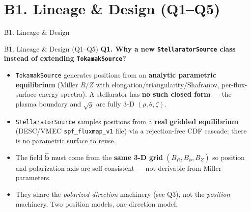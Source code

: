 \documentclass[11pt,aspectratio=169]{beamer}
\newcommand{\bhat}{\hat{\mathbf{b}}}
\newcommand{\qitem}[1]{\medskip\textbf{#1}\par}
\begin{document}
\section{B1. Lineage \& Design (Q1--Q5)}
\begin{frame}
\centering\vfill
{\Large\color{key} B1. Lineage \& Design}\par
{}
\vfill
\end{frame}

\begin{frame}[allowframebreaks]{B1. Lineage \& Design (Q1--Q5)}
\small
\qitem{Q1. Why a new \texttt{StellaratorSource} class instead of extending \texttt{TokamakSource}?}
\begin{itemize}
\item \texttt{TokamakSource} generates positions from an \textbf{analytic parametric
      equilibrium} (Miller $R/Z$ with elongation/triangularity/Shafranov, per-flux-surface
      energy spectra). A stellarator has \textbf{no such closed form} --- the plasma boundary
      and $\sqrt{g}$ are fully 3-D $(\rho,\theta,\zeta)$.
\item \texttt{StellaratorSource} samples positions from a \textbf{real gridded equilibrium}
      (DESC/VMEC \texttt{spf\_fluxmap\_v1} file) via a rejection-free CDF cascade; there is no
      parametric surface to reuse.
\item The field $\bhat$ must come from the \textbf{same 3-D grid} $(B_R, B_\phi, B_Z)$ so
      position and polarization axis are self-consistent --- not derivable from Miller
      parameters.
\item They share the \emph{polarized-direction} machinery (see Q3), not the \emph{position}
      machinery. Two position models, one direction model.
\end{itemize}


\end{frame}
\end{document}

